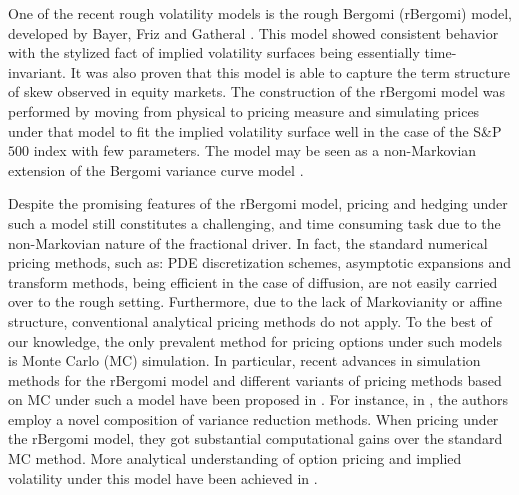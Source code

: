  One of the recent rough volatility models is the rough Bergomi (rBergomi) model, developed by Bayer, Friz and Gatheral \cite{bayer2016pricing}. This model showed   consistent behavior with the stylized fact of implied volatility surfaces being essentially time-invariant. It was also proven that this model 
 is able to capture the term structure of skew observed in equity markets. The construction of the rBergomi model was performed by  moving from  physical to pricing measure and simulating prices under that model to fit  the implied volatility surface well in the case of the S\&P $500$ index with few parameters. The model may be seen as a non-Markovian extension of the Bergomi variance curve model \cite{bergomi2005smile}.
 
Despite the promising features of the rBergomi model, pricing  and hedging under such a model still constitutes a challenging, and time consuming task due  to the non-Markovian nature of the fractional driver. In fact, the standard numerical pricing methods, such as: PDE discretization schemes, asymptotic expansions and transform
methods, being efficient in the case of diffusion, are not easily  carried over to the rough setting. Furthermore,  due to the lack of Markovianity or affine structure, conventional analytical pricing methods  do not apply. To the best of our knowledge, the only prevalent method for pricing  options under such models is Monte Carlo (MC) simulation. In particular,  recent advances in simulation methods for the rBergomi model and different variants of pricing methods based on  MC under such a model   have been proposed in \cite{bayer2016pricing,bayer2017regularity,mccrickerd2017turbocharging,bennedsen2017hybrid,jacquier2018vix}.  For instance, in \cite{mccrickerd2017turbocharging}, the authors employ a novel composition of variance reduction methods. When pricing under the rBergomi model, they got  substantial computational gains  over the standard MC method.  More   analytical understanding of option pricing and implied volatility under this model have been achieved  in \cite{jacquier2017pathwise,bayer2017short,forde2017asymptotics}. 

